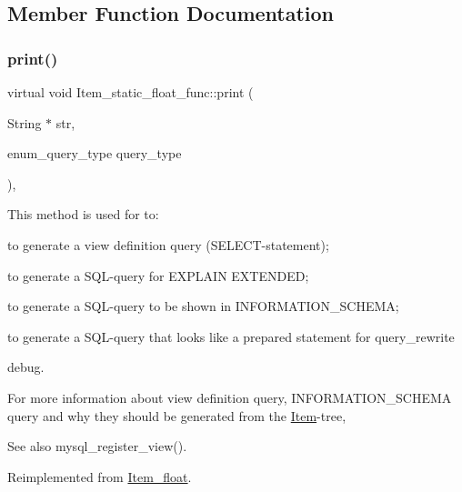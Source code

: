 \subsection{Member Function Documentation}
\mbox{\label{classItem__static__float__func_a01626caaf912493b016fc9b0d8eb7349}} 
\subsubsection{\texorpdfstring{print()}{print()}}
{\footnotesize\ttfamily virtual void Item\+\_\+static\+\_\+float\+\_\+func\+::print (\begin{DoxyParamCaption}\item[{String $\ast$}]{str,  }\item[{enum\+\_\+query\+\_\+type}]{query\+\_\+type }\end{DoxyParamCaption})\hspace{0.3cm}{\ttfamily [inline]}, {\ttfamily [virtual]}}

This method is used for to\+:
\begin{DoxyItemize}
\item to generate a view definition query (S\+E\+L\+E\+CT-\/statement);
\item to generate a S\+QL-\/query for E\+X\+P\+L\+A\+IN E\+X\+T\+E\+N\+D\+ED;
\item to generate a S\+QL-\/query to be shown in I\+N\+F\+O\+R\+M\+A\+T\+I\+O\+N\+\_\+\+S\+C\+H\+E\+MA;
\item to generate a S\+QL-\/query that looks like a prepared statement for query\+\_\+rewrite
\item debug.
\end{DoxyItemize}

For more information about view definition query, I\+N\+F\+O\+R\+M\+A\+T\+I\+O\+N\+\_\+\+S\+C\+H\+E\+MA query and why they should be generated from the \mbox{\hyperlink{classItem}{Item}}-\/tree, \begin{DoxySeeAlso}{See also}
mysql\+\_\+register\+\_\+view(). 
\end{DoxySeeAlso}


Reimplemented from \mbox{\hyperlink{classItem__float_a968cc4aafdeab156d234f92e5bcc2f9d}{Item\+\_\+float}}.

\mbox{\label{classItem__static__float__func_a9a61341166a21bae1b91976041ccbd52}} 
